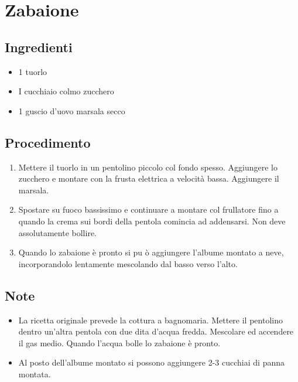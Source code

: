 \section{Zabaione}
\subsection{Ingredienti}
\begin{itemize}
\item 1 tuorlo   
\item I cucchiaio colmo zucchero  
\item 1 guscio d'uovo marsala secco
\end{itemize}
\subsection{Procedimento}
\begin{enumerate}
\item  Mettere il tuorlo in un pentolino piccolo col fondo spesso. Aggiungere lo zucchero e montare con la frusta elettrica a velocità bassa. Aggiungere il marsala.  
\item  Spostare su fuoco bassissimo e continuare a montare col frullatore fino a quando la crema sui bordi della pentola comincia ad addensarsi. Non deve assolutamente bollire.  
\item  Quando lo zabaione è pronto si pu ò aggiungere l'albume montato a neve, incorporandolo lentamente mescolando dal basso verso l'alto.
\end{enumerate}
\subsection{Note}
\begin{itemize}
\item La ricetta originale prevede la cottura a bagnomaria. Mettere il pentolino dentro un'altra pentola con due dita d'acqua fredda. Mescolare ed accendere il gas medio. Quando l'acqua bolle lo zabaione è pronto.  
\item Al posto dell'albume montato si possono aggiungere 2-3 cucchiai di panna montata.
\end{itemize}

